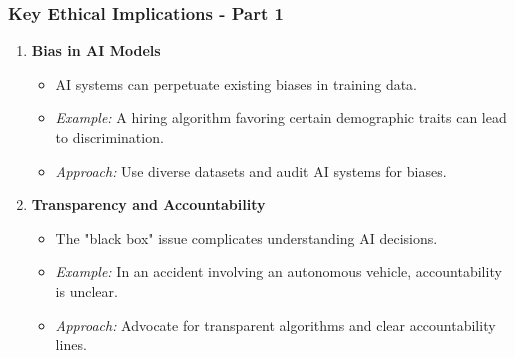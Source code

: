 \documentclass[aspectratio=169]{beamer}
\begin{document}
\begin{frame}[fragile]
    \frametitle{Key Ethical Implications - Part 1}
    \begin{enumerate}
        \item \textbf{Bias in AI Models}
        \begin{itemize}
            \item AI systems can perpetuate existing biases in training data.
            \item \textit{Example:} A hiring algorithm favoring certain demographic traits can lead to discrimination.
            \item \textit{Approach:} Use diverse datasets and audit AI systems for biases.
        \end{itemize}

        \item \textbf{Transparency and Accountability}
        \begin{itemize}
            \item The "black box" issue complicates understanding AI decisions.
            \item \textit{Example:} In an accident involving an autonomous vehicle, accountability is unclear.
            \item \textit{Approach:} Advocate for transparent algorithms and clear accountability lines.
        \end{itemize}
    \end{enumerate}
\end{frame}
\end{document}
